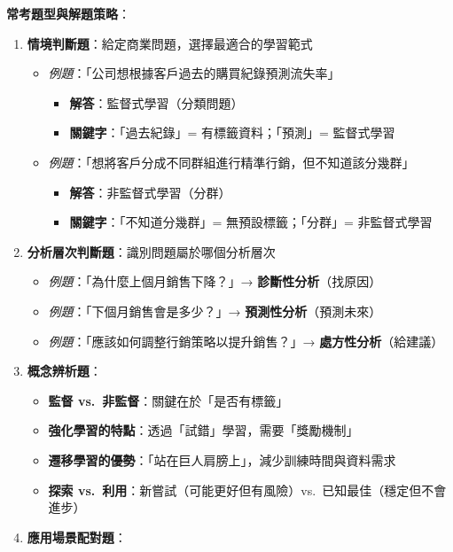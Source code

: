 \documentclass[
  letterpaper,
  DIV=11,
  numbers=noendperiod]{scrreprt}
\providecommand{\tightlist}{%
  \setlength{\itemsep}{0pt}\setlength{\parskip}{0pt}}
\begin{document}
\textbf{常考題型與解題策略}：

\begin{enumerate}
\def\labelenumi{\arabic{enumi}.}
\tightlist
\item
  \textbf{情境判斷題}：給定商業問題，選擇最適合的學習範式

  \begin{itemize}
  \tightlist
  \item
    \emph{例題}：「公司想根據客戶過去的購買紀錄預測流失率」

    \begin{itemize}
    \tightlist
    \item
      \textbf{解答}：監督式學習（分類問題）
    \item
      \textbf{關鍵字}：「過去紀錄」= 有標籤資料；「預測」= 監督式學習
    \end{itemize}
  \item
    \emph{例題}：「想將客戶分成不同群組進行精準行銷，但不知道該分幾群」

    \begin{itemize}
    \tightlist
    \item
      \textbf{解答}：非監督式學習（分群）
    \item
      \textbf{關鍵字}：「不知道分幾群」= 無預設標籤；「分群」=
      非監督式學習
    \end{itemize}
  \end{itemize}
\item
  \textbf{分析層次判斷題}：識別問題屬於哪個分析層次

  \begin{itemize}
  \tightlist
  \item
    \emph{例題}：「為什麼上個月銷售下降？」→
    \textbf{診斷性分析}（找原因）
  \item
    \emph{例題}：「下個月銷售會是多少？」→
    \textbf{預測性分析}（預測未來）
  \item
    \emph{例題}：「應該如何調整行銷策略以提升銷售？」→
    \textbf{處方性分析}（給建議）
  \end{itemize}
\item
  \textbf{概念辨析題}：

  \begin{itemize}
  \tightlist
  \item
    \textbf{監督 vs.~非監督}：關鍵在於「是否有標籤」
  \item
    \textbf{強化學習的特點}：透過「試錯」學習，需要「獎勵機制」
  \item
    \textbf{遷移學習的優勢}：「站在巨人肩膀上」，減少訓練時間與資料需求
  \item
    \textbf{探索
    vs.~利用}：新嘗試（可能更好但有風險）vs.~已知最佳（穩定但不會進步）
  \end{itemize}
\item
  \textbf{應用場景配對題}：


\end{enumerate}
\end{document}

